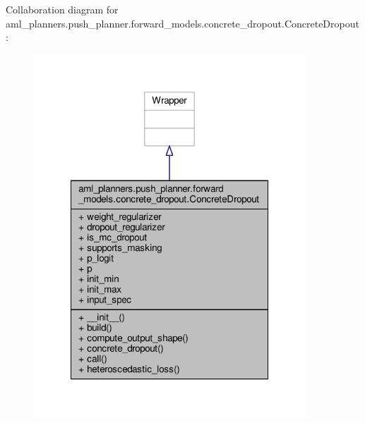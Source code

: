 Collaboration diagram for aml\-\_\-planners.\-push\-\_\-planner.\-forward\-\_\-models.\-concrete\-\_\-dropout.\-Concrete\-Dropout\-:
\nopagebreak
\begin{figure}[H]
\begin{center}
\leavevmode
\includegraphics[width=288pt]{classaml__planners_1_1push__planner_1_1forward__models_1_1concrete__dropout_1_1_concrete_dropout__coll__graph}
\end{center}
\end{figure}
